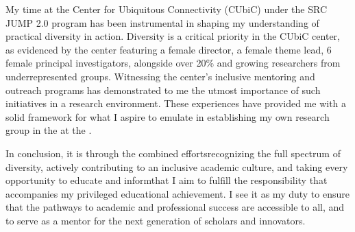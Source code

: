 My time at the Center for Ubiquitous Connectivity (CUbiC) under the SRC JUMP 2.0 program has been instrumental in shaping my understanding of practical diversity in action. Diversity is a critical priority in the CUbiC center, as evidenced by the center featuring a female director, a female theme lead, 6 female principal investigators, alongside over 20\% and growing researchers from underrepresented groups. Witnessing the center's inclusive mentoring and outreach programs has demonstrated to me the utmost importance of such initiatives in a research environment. These experiences have provided me with a solid framework for what I aspire to emulate in establishing my own research group in the \appDept{} at the \appSchool{}.

In conclusion, it is through the combined efforts\textemdash recognizing the full spectrum of diversity, actively contributing to an inclusive academic culture, and taking every opportunity to educate and inform\textemdash that I aim to fulfill the responsibility that accompanies my privileged educational achievement. I see it as my duty to ensure that the pathways to academic and professional success are accessible to all, and to serve as a mentor for the next generation of scholars and innovators.


